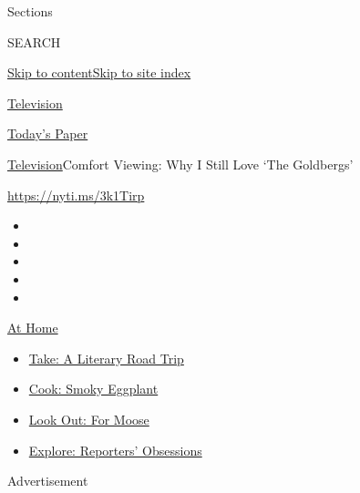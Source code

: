 Sections

SEARCH

\protect\hyperlink{site-content}{Skip to
content}\protect\hyperlink{site-index}{Skip to site index}

\href{https://www.nytimes.com/section/arts/television}{Television}

\href{https://myaccount.nytimes.com/auth/login?response_type=cookie\&client_id=vi}{}

\href{https://www.nytimes.com/section/todayspaper}{Today's Paper}

\href{/section/arts/television}{Television}\textbar{}Comfort Viewing:
Why I Still Love `The Goldbergs'

\url{https://nyti.ms/3k1Tirp}

\begin{itemize}
\item
\item
\item
\item
\item
\end{itemize}

\href{https://www.nytimes.com/spotlight/at-home?action=click\&pgtype=Article\&state=default\&region=TOP_BANNER\&context=at_home_menu}{At
Home}

\begin{itemize}
\tightlist
\item
  \href{https://www.nytimes.com/2020/07/28/books/time-for-a-literary-road-trip.html?action=click\&pgtype=Article\&state=default\&region=TOP_BANNER\&context=at_home_menu}{Take:
  A Literary Road Trip}
\item
  \href{https://www.nytimes.com/2020/07/29/magazine/bored-with-your-home-cooking-some-smoky-eggplant-will-fix-that.html?action=click\&pgtype=Article\&state=default\&region=TOP_BANNER\&context=at_home_menu}{Cook:
  Smoky Eggplant}
\item
  \href{https://www.nytimes.com/2020/07/27/travel/moose-michigan-isle-royale.html?action=click\&pgtype=Article\&state=default\&region=TOP_BANNER\&context=at_home_menu}{Look
  Out: For Moose}
\item
  \href{https://www.nytimes.com/interactive/2020/at-home/even-more-reporters-editors-diaries-lists-recommendations.html?action=click\&pgtype=Article\&state=default\&region=TOP_BANNER\&context=at_home_menu}{Explore:
  Reporters' Obsessions}
\end{itemize}

Advertisement

